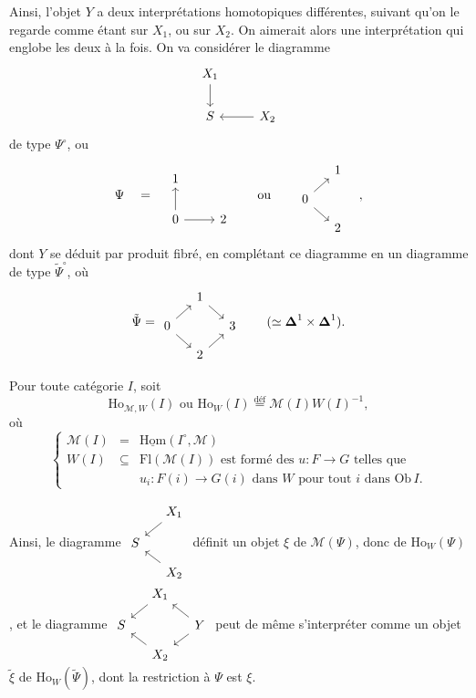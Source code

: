 \documentclass[11pt]{article}
\newcommand{\printedpage}[1]{\marginpar{\footnotesize p.~#1}}
\newcommand{\msp}[1]{\marginpar{\footnotesize [#1]}}
\newcommand{\Homu}{\underline{\mathrm{Hom}}}
\newcommand{\Ho}{\mathrm{Ho}}
\begin{document}
Ainsi, l'objet $Y$ a deux interprétations homotopiques différentes, suivant qu'on le regarde comme étant sur $X_1$, ou sur $X_2$. On aimerait alors une interprétation qui englobe les deux à la fois. On va considérer le diagramme
\[
\begin{tikzcd}
X_1 \arrow[d] & \\
S & X_2 \arrow[l]
\end{tikzcd}
\]
de type $\Psi^\circ$, ou
\[
\Psi \quad = \quad
\begin{tikzcd}
1 & \\
0 \arrow[u] \arrow[r] & 2
\end{tikzcd}
\qquad \text{ou} \qquad
\begin{tikzcd}[row sep=small, column sep=small]
 & 1 \\
0 \arrow[ur] \arrow[dr] & \\
 & 2
\end{tikzcd}
\quad ,
\]
\printedpage{157}
dont $Y$ se déduit par produit fibré, en complétant ce diagramme en un diagramme de type $\tilde{\Psi}^\circ$, où
\[
\tilde{\Psi} =
\begin{tikzcd}[row sep=small, column sep=small]
 & 1 \arrow[dr] & \\
0 \arrow[ur] \arrow[dr] & & 3 \\
 & 2 \arrow[ur] &
\end{tikzcd}
\qquad (\simeq \boldsymbol{\Delta}^1 \times \boldsymbol{\Delta}^1).
\]

\msp{page 243}
Pour toute catégorie $I$, soit
\[
\Ho_{\mathcal{M},W}(I) \text{ \ ou \ } \Ho_W(I) \overset{\text{déf}}{=} \mathcal{M}(I)W(I)^{-1},
\]
où
\[
\left\{
\begin{array}{rcl}
\mathcal{M}(I) & = & \Homu(I^\circ, \mathcal{M}) \\[1ex]
W(I) & \subseteq & \mathrm{Fl}(\mathcal{M}(I)) \text{ est formé des } u : F \longrightarrow G \text{ telles que} \\[1ex]
 & & u_i : F(i) \longrightarrow G(i) \text{ dans } W \text{ pour tout } i \text{ dans } \mathrm{Ob}\, I.
\end{array}
\right.
\]

Ainsi, le diagramme $\vcenter{\hbox{\begin{tikzcd}[row sep=small, column sep=small]
 & X_1 \arrow[dl] \\
S & \\
 & X_2 \arrow[ul]
\end{tikzcd}}}$ définit un objet $\xi$ de $\mathcal{M}(\Psi)$, donc de $\Ho_W(\Psi)$, et le diagramme $\vcenter{\hbox{\begin{tikzcd}[row sep=small, column sep=small]
 & X_1 \arrow[dl] & \\
S & & Y \arrow[ul] \arrow[dl] \\
 & X_2 \arrow[ul] &
\end{tikzcd}}}$ peut de même s'interpréter comme un objet $\tilde{\xi}$ de $\Ho_W(\tilde{\Psi})$, dont la restriction à $\Psi$ est $\xi$.
\end{document}
